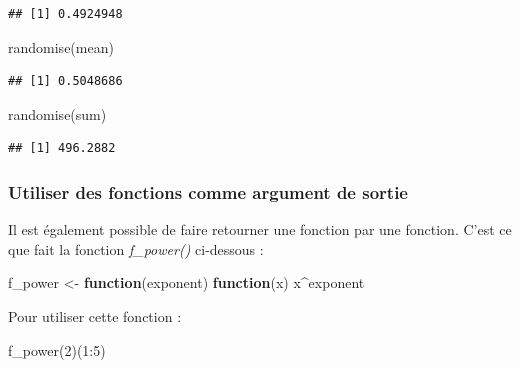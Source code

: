 \documentclass[
]{book}
\newenvironment{Shaded}{\begin{snugshade}}{\end{snugshade}}
\newcommand{\ControlFlowTok}[1]{\textcolor[rgb]{0.13,0.29,0.53}{\textbf{#1}}}
\newcommand{\DecValTok}[1]{\textcolor[rgb]{0.00,0.00,0.81}{#1}}
\newcommand{\FunctionTok}[1]{\textcolor[rgb]{0.00,0.00,0.00}{#1}}
\newcommand{\NormalTok}[1]{#1}
\newcommand{\OtherTok}[1]{\textcolor[rgb]{0.56,0.35,0.01}{#1}}
\newcommand{\SpecialCharTok}[1]{\textcolor[rgb]{0.00,0.00,0.00}{#1}}
\theoremstyle{definition}
\theoremstyle{definition}
\theoremstyle{definition}
\theoremstyle{definition}
\theoremstyle{remark}
\begin{document}
\begin{verbatim}
## [1] 0.4924948
\end{verbatim}

\begin{Shaded}
\begin{Highlighting}[]
\FunctionTok{randomise}\NormalTok{(mean)}
\end{Highlighting}
\end{Shaded}

\begin{verbatim}
## [1] 0.5048686
\end{verbatim}

\begin{Shaded}
\begin{Highlighting}[]
\FunctionTok{randomise}\NormalTok{(sum)}
\end{Highlighting}
\end{Shaded}

\begin{verbatim}
## [1] 496.2882
\end{verbatim}

\hypertarget{utiliser-des-fonctions-comme-argument-de-sortie}{%
\subsubsection{Utiliser des fonctions comme argument de sortie}\label{utiliser-des-fonctions-comme-argument-de-sortie}}

Il est également possible de faire retourner une fonction par une fonction. C'est ce que fait la fonction \emph{f\_power()} ci-dessous :

\begin{Shaded}
\begin{Highlighting}[]
\NormalTok{f\_power }\OtherTok{\textless{}{-}} \ControlFlowTok{function}\NormalTok{(exponent)}
  \ControlFlowTok{function}\NormalTok{(x) x}\SpecialCharTok{\^{}}\NormalTok{exponent }
\end{Highlighting}
\end{Shaded}

Pour utiliser cette fonction :

\begin{Shaded}
\begin{Highlighting}[]
\FunctionTok{f\_power}\NormalTok{(}\DecValTok{2}\NormalTok{)(}\DecValTok{1}\SpecialCharTok{:}\DecValTok{5}\NormalTok{)}
\end{Highlighting}
\end{Shaded}
\end{document}
